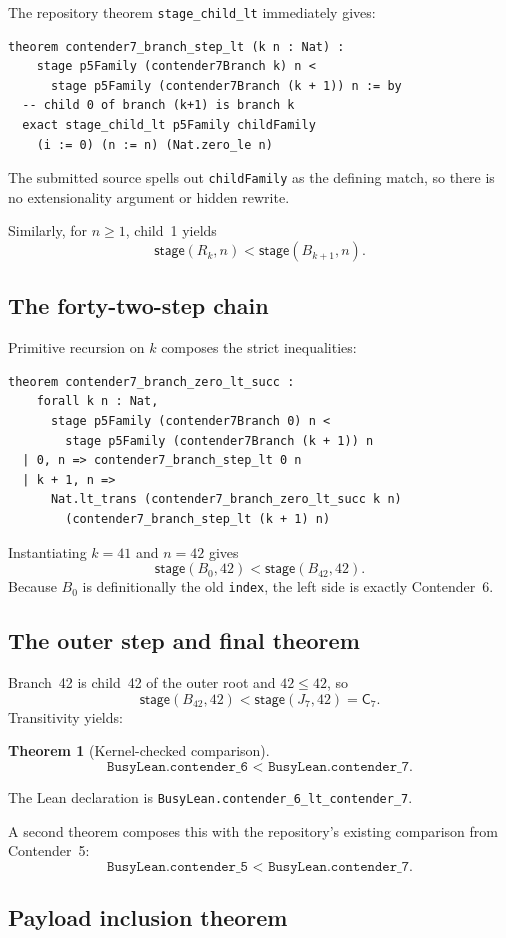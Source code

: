 \documentclass[11pt]{article}
\newtheorem{theorem}{Theorem}
\theoremstyle{definition}
\theoremstyle{remark}
\newcommand{\Stage}{\ensuremath{\mathsf{stage}}}
\newcommand{\Cseven}{\ensuremath{\mathsf{C}_7}}
\newcommand{\lean}[1]{\texttt{#1}}
\begin{document}
The repository theorem \lean{stage\_child\_lt} immediately gives:
\begin{lstlisting}
theorem contender7_branch_step_lt (k n : Nat) :
    stage p5Family (contender7Branch k) n <
      stage p5Family (contender7Branch (k + 1)) n := by
  -- child 0 of branch (k+1) is branch k
  exact stage_child_lt p5Family childFamily
    (i := 0) (n := n) (Nat.zero_le n)
\end{lstlisting}
The submitted source spells out \lean{childFamily} as the defining match, so
there is no extensionality argument or hidden rewrite.

Similarly, for $n\ge1$, child~1 yields
\[
  \Stage(R_k,n)<\Stage(B_{k+1},n).
\]

\subsection{The forty-two-step chain}

Primitive recursion on $k$ composes the strict inequalities:
\begin{lstlisting}
theorem contender7_branch_zero_lt_succ :
    forall k n : Nat,
      stage p5Family (contender7Branch 0) n <
        stage p5Family (contender7Branch (k + 1)) n
  | 0, n => contender7_branch_step_lt 0 n
  | k + 1, n =>
      Nat.lt_trans (contender7_branch_zero_lt_succ k n)
        (contender7_branch_step_lt (k + 1) n)
\end{lstlisting}
Instantiating $k=41$ and $n=42$ gives
\[
  \Stage(B_0,42)<\Stage(B_{42},42).
\]
Because $B_0$ is definitionally the old \lean{index}, the left side is exactly
Contender~6.

\subsection{The outer step and final theorem}

Branch~42 is child~42 of the outer root and $42\le42$, so
\[
  \Stage(B_{42},42)<\Stage(J_7,42)=\Cseven.
\]
Transitivity yields:
\begin{theorem}[Kernel-checked comparison]
\[
  \lean{BusyLean.contender\_6 < BusyLean.contender\_7}.
\]
\end{theorem}
The Lean declaration is
\lean{BusyLean.contender\_6\_lt\_contender\_7}.

A second theorem composes this with the repository's existing comparison from
Contender~5:
\[
  \lean{BusyLean.contender\_5 < BusyLean.contender\_7}.
\]

\subsection{Payload inclusion theorem}
\end{document}
